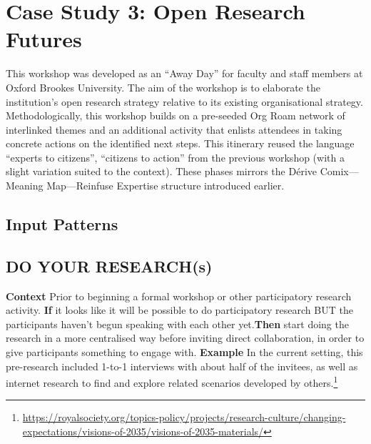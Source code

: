 \documentclass[acmlarge,timestamp]{acmart}
\newcommand{\sensory}{(s)}
\begin{document}

\clearpage
\section{Case Study 3: Open Research Futures}

This workshop was developed as an “Away Day” for faculty and staff
members at Oxford Brookes University.  The aim of the workshop is to
elaborate the institution’s open research strategy relative to its
existing organisational strategy.  Methodologically, this workshop
builds on a pre-seeded Org Roam network of interlinked themes and an
additional activity that enlists attendees in taking concrete actions
on the identified next steps.  This itinerary reused the language
“experts to citizens”, “citizens to action” from the previous workshop
(with a slight variation suited to the context).  These phases mirrors
the {\sc Dérive Comix}—{\sc Meaning Map}—{\sc Reinfuse Expertise}
structure introduced earlier.

\subsection{Input Patterns}

\subsection*{DO YOUR RESEARCH{\hfill\sensory}}
\textbf{Context} Prior to beginning a formal workshop or other participatory research activity.\newline
\textbf{If} it looks like it will be possible to do participatory research BUT the participants haven’t begun speaking with each other yet.\newline \textbf{Then}
start doing the research in a more centralised way before inviting direct collaboration, in order to give participants something to engage with.\newline
\textbf{Example} In the current setting, this pre-research included 1-to-1 interviews with about half of the invitees, as well as internet research to find and explore related scenarios developed by others.\footnote{\url{https://royalsociety.org/topics-policy/projects/research-culture/changing-expectations/visions-of-2035/visions-of-2035-materials/}}
\end{document}
